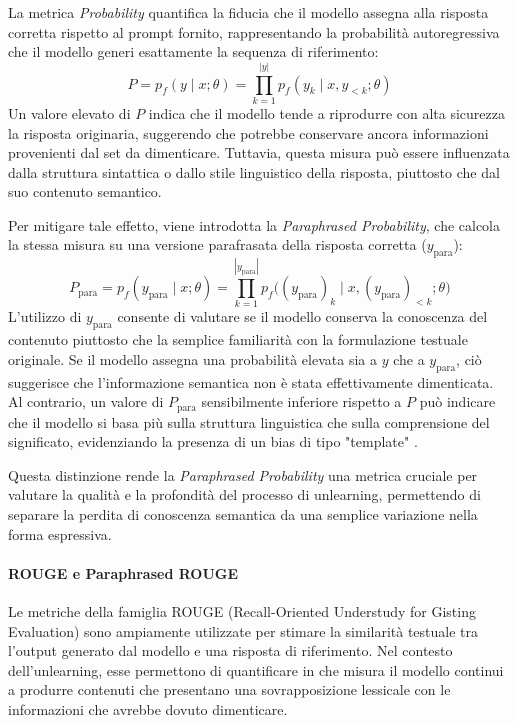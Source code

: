La metrica \textit{Probability} quantifica la fiducia che il modello assegna alla risposta corretta rispetto al prompt fornito, rappresentando la probabilità autoregressiva che il modello generi esattamente la sequenza di riferimento:
\[
P = p_f(y \mid x; \theta) = \prod_{k=1}^{|y|} p_f(y_k \mid x, y_{<k}; \theta)
\]
Un valore elevato di \( P \) indica che il modello tende a riprodurre con alta sicurezza la risposta originaria, suggerendo che potrebbe conservare ancora informazioni provenienti dal set da dimenticare.  
Tuttavia, questa misura può essere influenzata dalla struttura sintattica o dallo stile linguistico della risposta, piuttosto che dal suo contenuto semantico.

Per mitigare tale effetto, viene introdotta la \textit{Paraphrased Probability}, che calcola la stessa misura su una versione parafrasata della risposta corretta (\( y_{\text{para}} \)):
\[
P_{\text{para}} = p_f(y_{\text{para}} \mid x; \theta ) 
= \prod_{k=1}^{|y_{\text{para}}|} p_f\bigl( (y_{\text{para}})_k \mid x, (y_{\text{para}})_{<k}; \theta \bigr)
\]
L'utilizzo di \( y_{\text{para}} \) consente di valutare se il modello conserva la conoscenza del contenuto piuttosto che la semplice familiarità con la formulazione testuale originale.  
Se il modello assegna una probabilità elevata sia a \( y \) che a \( y_{\text{para}} \), ciò suggerisce che l'informazione semantica non è stata effettivamente dimenticata.  
Al contrario, un valore di \( P_{\text{para}} \) sensibilmente inferiore rispetto a \( P \) può indicare che il modello si basa più sulla struttura linguistica che sulla comprensione del significato, evidenziando la presenza di un bias di tipo "template" \cite{maini2024tofu}.

Questa distinzione rende la \textit{Paraphrased Probability} una metrica cruciale per valutare la qualità e la profondità del processo di unlearning, permettendo di separare la perdita di conoscenza semantica da una semplice variazione nella forma espressiva.

\paragraph{ROUGE e Paraphrased ROUGE}
Le metriche della famiglia ROUGE (Recall-Oriented Understudy for Gisting Evaluation) sono ampiamente utilizzate per stimare la similarità testuale tra l’output generato dal modello e una risposta di riferimento. Nel contesto dell’unlearning, esse permettono di quantificare in che misura il modello continui a produrre contenuti che presentano una sovrapposizione lessicale con le informazioni che avrebbe dovuto dimenticare.

